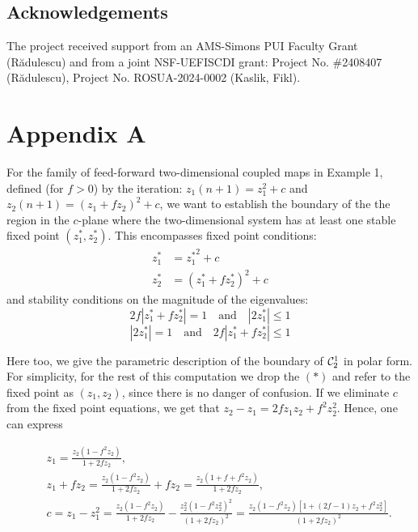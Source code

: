 \documentclass[10pt]{article}
\begin{document}
\subsection*{Acknowledgements}

The project received support from an AMS-Simons PUI Faculty Grant (R\u{a}dulescu) and from a joint NSF-UEFISCDI grant: Project No. \#2408407 (R\u{a}dulescu), Project No. ROSUA-2024-0002 (Kaslik, Fikl).

\section*{Appendix A}

For the family of feed-forward two-dimensional coupled maps in Example 1, defined (for $f > 0$) by the iteration:
$z_1(n+1) = z_1^2 + c$ and $z_2(n+1) = (z_1 + f z_2)^2 + c$, we want to establish the boundary of the the region in the $c$-plane where the two-dimensional system has at least one stable fixed point $(z_1^*,z_2^*)$. This encompasses fixed point conditions:
\begin{align}
z^*_1 &= {z^*_1}^2+c
\tag{F1} \label{fixed1}\\
z^*_2 &= (z^*_1+fz^*_2)^2+c
\tag{F2} \label{fixed2}
\end{align}
and stability conditions on the magnitude of the eigenvalues:
\begin{equation}
2f |z^*_1+fz^*_2 | =1 \quad \text{and} \quad |2z^*_1 | \leq 1
\tag{S1} \label{stab1}
\end{equation}
\begin{equation}
|2z^*_1 | = 1 \quad \text{and} \quad 2f|z^*_1+fz^*_2 | \leq 1
\tag{S2} \label{stab2}
\end{equation}

Here too, we give the parametric description of the boundary of ${\cal C}_2^1$ in polar form. For simplicity, for the rest of this computation we drop the $(*)$ and refer to the fixed point as $(z_1,z_2)$, since there is no danger of confusion. If we eliminate $c$ from the fixed point equations, we get that $z_2-z_1 = 2fz_1z_2+f^2z_2^2$. Hence, one can express

\begin{eqnarray*}
& & z_1
    = \frac{z_2 (1 - f^2 z_2)}{1 + 2 f z_2}, \\
& & z_1 + f z_2
    = \frac{z_2 (1 - f^2 z_2)}{1 + 2 f z_2} + f z_2
    = \frac{z_2 (1 + f + f^2 z_2)}{1 + 2 f z_2}, \\
& & c = z_1 - z_1^2
    = \frac{z_2 (1 - f^2 z_2)}{1 + 2 f z_2}
    - \frac{z_2^2 (1 - f^2 z_2^2)^2}{(1 + 2 f z_2)^2}
    = \frac{z_2 (1 - f^2 z_2)[1 + (2 f - 1) z_2 + f^2 z_2^2]}{(1 + 2 f z_2)^2}.
\end{eqnarray*}
\end{document}
